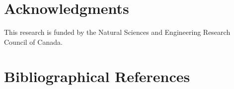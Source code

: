 \documentclass[10pt, a4paper]{article}
\begin{document}
\section{Acknowledgments}

This research is funded by the Natural Sciences and Engineering
Research Council of Canada.


\section{Bibliographical References}
\label{main:ref}





\end{document}

